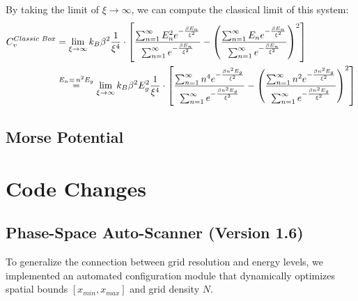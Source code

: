 \documentclass{article}
\numberwithin{equation}{subsection}
\begin{document}
\begin{enumerate}
\begin{enumerate}
        By taking the limit of $\xi\rightarrow \infty$, we can compute the classical limit of this system:
        \begin{equation}
        \begin{split}
            C_v^{Classic \hspace{1mm} Box} &= \lim_{\xi\rightarrow\infty} k_B \beta^2 \frac{1}{\xi^4} \cdot \left[\frac{\sum_{n=1}^\infty E_n^2 e^{- \frac{\beta E_n}{\xi^2}} }{\sum_{n=1}^\infty e^{-\frac{\beta E_n}{\xi^2} }} - \left( \frac{\sum_{n=1}^\infty E_n e^{-\frac{\beta E_n}{\xi^2} } }{\sum_{n=1}^\infty e^{-\frac{\beta E_n}{\xi^2} } } \right)^2 \right] 
            \\
            &\overset{E_n = \hspace{0.5mm} n^2E_g}{=} \lim_{\xi\rightarrow\infty} k_B \beta^2 E_g^2 \frac{1}{\xi^4}  \cdot \left[\frac{\sum_{n=1}^\infty n^4 e^{- \frac{\beta n^2 E_g}{\xi^2}} }{\sum_{n=1}^\infty e^{-\frac{\beta n^2 E_g}{\xi^2} } } - \left( \frac{\sum_{n=1}^\infty n^2 e^{-\frac{\beta n^2 E_g}{\xi^2} } }{\sum_{n=1}^\infty e^{-\frac{\beta n^2 E_g}{\xi^2} } } \right)^2 \right]
        \end{split}
        \end{equation}
    
    \end{enumerate}
\end{enumerate}
\subsection{Morse Potential}

\section{Code Changes}
\subsection*{Phase-Space Auto-Scanner (Version 1.6)}
To generalize the connection between grid resolution and energy levels, we implemented an automated configuration module that dynamically optimizes spatial bounds $[x_{min}, x_{max}]$ and grid density $N$. 
\end{document}
